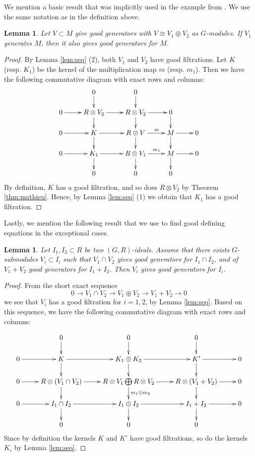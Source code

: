 \documentclass[11pt]{amsart}
\numberwithin{equation}{section}
\newtheorem{lemma}[equation]{Lemma}
\theoremstyle{definition}
\newcommand{\oo}{\otimes}
\begin{document}
We mention a basic result that was implicitly used in the example from \cite[Section 4.1]{me}. We use the same notation as in the definition above.

\begin{lemma}\label{lem:throwgens}
Let $V\subset M$ give good generators with $V\cong V_1 \oplus V_2$ as $G$-modules. If $V_1$ generates $M$, then it also gives good generators for $M$.
\end{lemma}

\begin{proof}
By Lemma \ref{lem:seq} (2), both $V_1$ and $V_2$ have good filtrations. Let $K$ (resp. $K_1$) be the kernel of the multiplication map $m$ (resp. $m_1$). Then we have the following commutative diagram with exact rows and columns:
\[\xymatrix@R1.3pc{
& 0 \ar[d] &  0 \ar[d] & & \\
0 \ar[r] & R\oo V_2 \ar[r] \ar[d] & R\oo V_2 \ar[r] \ar[d] & 0  \ar[d] &\\
0 \ar[r] & K \ar[r] \ar[d] & R\oo V \ar[d] \ar[r]^{\quad m} & M \ar[r] \ar[d]& 0\\
0 \ar[r] & K_1 \ar[r] \ar[d] & R\oo V_1 \ar[d] \ar[r]^{\quad m_1} & M \ar[r] \ar[d] & 0 \\
 & 0 & 0 & 0 &
}\]
By definition, $K$ has a good filtration, and so does $R\oo V_2$ by Theorem \ref{thm:mathieu}. Hence, by Lemma \ref{lem:seq} (1) we obtain that $K_1$ has a good filtration.
\end{proof}

Lastly, we mention the following result that we use to find good defining equations in the exceptional cases.

\begin{lemma}\label{lem:reducible}
Let $I_1, I_2 \subset R$ be two $(G,R)$-ideals. Assume that there exists $G$-submodules $V_{i}\subset I_i$ such that $V_{1} \cap V_{2}$ gives good generators for $I_1 \cap I_2$, and of $V_{1} + V_{2}$ good generators for $I_1+I_2$. Then $V_{i}$ gives good generators for $I_i$.
\end{lemma}

\begin{proof}
From the short exact sequence 
\[0 \to V_{1} \cap V_{2} \to V_{1} \oplus V_{2} \to V_{1} + V_{2} \to 0\]
we see that $V_{i}$ has a good filtration for $i=1,2$, by Lemma \ref{lem:seq}. Based on this sequence, we have the following commutative diagram with exact rows and columns:

\[
\xymatrix@R1.4pc{
& 0 \ar[d] &  0 \ar[d] & 0 \ar[d] & \\
0 \ar[r] & K \ar[r] \ar[d] & K_1 \oplus K_2 \ar[r] \ar[d] & K'  \ar[d] \ar[r] & 0\\
0 \ar[r] &  R\oo (V_1 \cap V_{2}) \ar[r] \ar[d] & R\oo V_{1} \bigoplus R\oo V_{2} \ar[d]^{m_{1}\oplus m_{2}} \ar[r] & R\oo (V_{1} + V_{2}) \ar[r] \ar[d]& 0\\
0 \ar[r] & I_1 \cap I_2 \ar[r] \ar[d] & I_1 \oplus I_2 \ar[d] \ar[r] & I_1 + I_2 \ar[r] \ar[d] & 0 \\
 & 0 & 0 & 0 &
}\]
Since by definition the kernels $K$ and $K'$ have good filtrations, so do the kernels $K_i$ by Lemma \ref{lem:seq}.
\end{proof}
\end{document}
